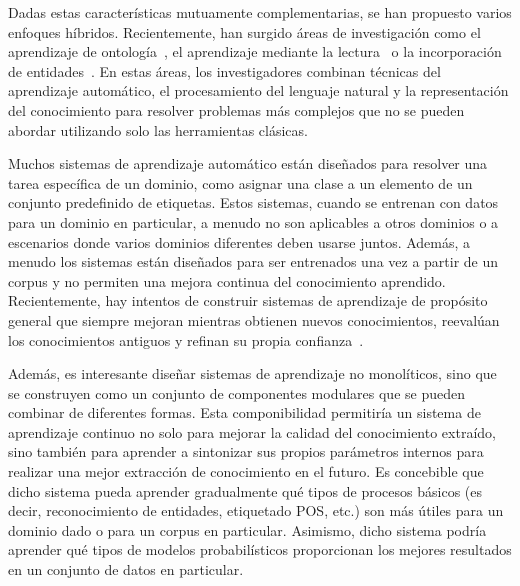 Dadas estas características mutuamente complementarias, se han propuesto varios enfoques híbridos. Recientemente, han surgido áreas de investigación como el aprendizaje de ontología~\cite{cimiano2009ontology}, el aprendizaje mediante la lectura~\cite{barker2007learning} o la incorporación de entidades~\cite{hu2015entity}.
En estas áreas, los investigadores combinan técnicas del aprendizaje automático, el procesamiento del lenguaje natural y la representación del conocimiento para resolver problemas más complejos que no se pueden abordar utilizando solo las herramientas clásicas.

Muchos sistemas de aprendizaje automático están diseñados para resolver una tarea específica de un dominio, como asignar una clase a un elemento de un conjunto predefinido de etiquetas. Estos sistemas, cuando se entrenan con datos para un dominio en particular, a menudo no son aplicables a otros dominios o a escenarios donde varios dominios diferentes deben usarse juntos. Además, a menudo los sistemas están diseñados para ser entrenados una vez a partir de un corpus y no permiten una mejora continua del conocimiento aprendido. Recientemente, hay intentos de construir sistemas de aprendizaje de propósito general que siempre mejoran mientras obtienen nuevos conocimientos, reevalúan los conocimientos antiguos y refinan su propia confianza~\cite{mitchell2015never}.

Además, es interesante diseñar sistemas de aprendizaje no monolíticos, sino que se construyen como un conjunto de componentes modulares que se pueden combinar de diferentes formas. Esta componibilidad permitiría un sistema de aprendizaje continuo no solo para mejorar la calidad del conocimiento extraído, sino también para aprender a sintonizar sus propios parámetros internos para realizar una mejor extracción de conocimiento en el futuro. Es concebible que dicho sistema pueda aprender gradualmente qué tipos de procesos básicos (es decir, reconocimiento de entidades, etiquetado POS, etc.) son más útiles para un dominio dado o para un corpus en particular. Asimismo, dicho sistema podría aprender qué tipos de modelos probabilísticos proporcionan los mejores resultados en un conjunto de datos en particular.

